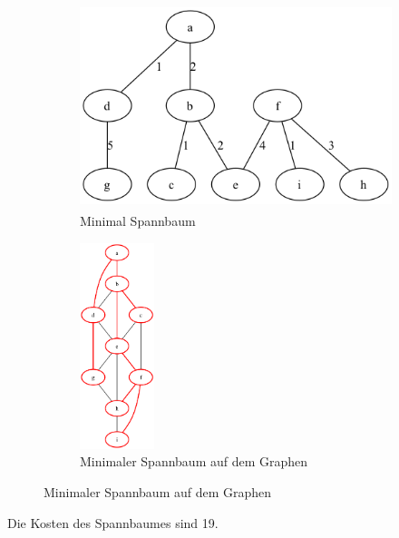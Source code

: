 \documentclass[a4paper,11pt]{report}
\begin{document}
    \begin{figure}[htbp]
        \centering
        \begin{subfigure}[b]{0.3\textwidth}
            \includegraphics[height=6cm]{a02a_mst}
            \caption{Minimal Spannbaum}
            \label{fig:a02_mst}
        \end{subfigure}
        \begin{subfigure}[b]{0.3\textwidth}
            \includegraphics[height=6cm]{a02a_graph_highlighted}
            \caption{Minimaler Spannbaum auf dem Graphen}
            \label{fig:a02_graph_highlighted}
        \end{subfigure}
    \end{figure}

    Die Kosten des Spannbaumes sind 19.

    \newpage
\end{document}
